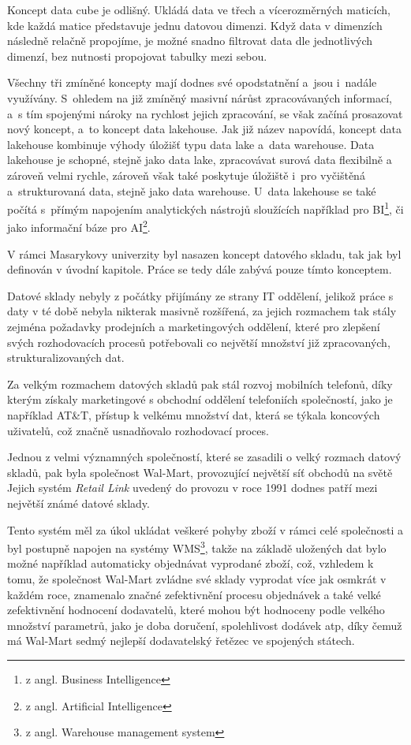 \documentclass[
  digital,     %
  twoside,     %
  lof,         %
  lot,         %
]{fithesis4}
\begin{document}
Koncept data cube je odlišný. Ukládá data ve třech a vícerozměrných maticích, kde každá matice představuje jednu datovou dimenzi. Když
data v dimenzích následně relačně propojíme, je možné snadno filtrovat data dle
jednotlivých dimenzí, bez nutnosti propojovat tabulky mezi sebou.\parencite{Foote19042018}

Všechny tři zmíněné koncepty mají dodnes své opodstatnění a jsou i nadále využívány. S ohledem na již zmíněný masivní nárůst zpracovávaných informací, a s tím spojenými nároky na rychlost jejich zpracování, se však začíná prosazovat nový koncept, a to koncept data lakehouse. Jak již název napovídá, koncept data lakehouse kombinuje výhody úložišť typu data lake a data warehouse. Data lakehouse je schopné, stejně jako data lake, zpracovávat surová data flexibilně a zároveň velmi rychle, zároveň však také poskytuje úložiště i pro vyčištěná a strukturovaná data, stejně jako data warehouse. U data lakehouse se také počítá s přímým napojením analytických nástrojů sloužících například pro BI\footnote{z angl. Business Intelligence}, či jako informační báze pro AI\footnote{z angl. Artificial Intelligence}.

V rámci Masarykovy univerzity byl nasazen koncept datového skladu, tak jak byl definován v úvodní kapitole. Práce se tedy dále zabývá pouze tímto konceptem.

Datové sklady nebyly z počátky přijímány ze strany IT oddělení, jelikož práce s daty v té době nebyla nikterak masivně rozšířená, za jejich rozmachem tak stály zejména požadavky prodejních a marketingových oddělení, které pro zlepšení svých rozhodovacích procesů potřebovali co největší množství již zpracovaných, strukturalizovaných dat. \parencite{Inmon2021}


Za velkým rozmachem datových skladů pak stál rozvoj mobilních telefonů, díky kterým získaly marketingové s obchodní oddělení telefoniích společností, jako je například AT&T, přístup k velkému množství dat, která se týkala koncových uživatelů, což značně usnadňovalo rozhodovací proces.\parencite{Inmon2021}

Jednou z velmi významných společností, které se zasadili o velký rozmach datový skladů, pak byla společnost Wal-Mart, provozující největší síť obchodů na světě Jejich systém \emph{Retail Link} uvedený do provozu v roce 1991 dodnes patří mezi největší známé datové sklady.\parencite{Gallaugher2018}

Tento systém měl za úkol ukládat veškeré pohyby zboží v rámci celé společnosti a byl postupně napojen na systémy WMS\footnote{z angl. Warehouse management system}, takže na základě uložených dat bylo možné například automaticky objednávat vyprodané zboží, což, vzhledem k tomu, že společnost Wal-Mart zvládne své sklady vyprodat více jak osmkrát v každém roce, znamenalo značné zefektivnění procesu objednávek a také velké zefektivnění hodnocení dodavatelů, které mohou být hodnoceny podle velkého množství parametrů, jako je doba doručení, spolehlivost dodávek atp, díky čemuž má Wal-Mart sedmý nejlepší dodavatelský řetězec ve spojených státech.\parencite{Gallaugher2018}  
\end{document}
